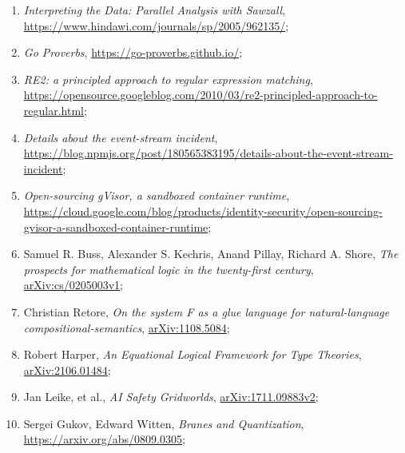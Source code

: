 \documentclass[a4paper,11pt]{article}
\begin{document}
\begin{enumerate}
\item \textit{Interpreting the Data: Parallel Analysis with Sawzall},
  \href{https://www.hindawi.com/journals/sp/2005/962135/}{https://www.hindawi.com/journals/sp/2005/962135/};

\item \textit{Go Proverbs},
  \href{https://go-proverbs.github.io/}{https://go-proverbs.github.io/};

\item \textit{RE2: a principled approach to regular expression
    matching}, \\
  \href{https://opensource.googleblog.com/2010/03/re2-principled-approach-to-regular.html}{https://opensource.googleblog.com/2010/03/re2-principled-approach-to-regular.html};

\item \textit{Details about the event-stream incident}, \\
  \href{https://blog.npmjs.org/post/180565383195/details-about-the-event-stream-incident}{https://blog.npmjs.org/post/180565383195/details-about-the-event-stream-incident};

\item \textit{Open-sourcing gVisor, a sandboxed container runtime}, \\
  \href{https://cloud.google.com/blog/products/identity-security/open-sourcing-gvisor-a-sandboxed-container-runtime}{https://cloud.google.com/blog/products/identity-security/open-sourcing-gvisor-a-sandboxed-container-runtime};

\item Samuel R. Buss, Alexander S. Kechris, Anand Pillay, Richard A.
  Shore, \textit{The prospects for mathematical logic in the
    twenty-first century},
  \href{https://arxiv.org/abs/cs/0205003v1}{arXiv:cs/0205003v1};

\item Christian Retore, \textit{On the system F as a glue language for
    natural-language compositional-semantics},
  \href{https://arxiv.org/abs/1108.5084}{arXiv:1108.5084};

\item Robert Harper, \textit{An Equational Logical Framework for Type
    Theories},
  \href{https://arxiv.org/abs/2106.01484}{arXiv:2106.01484};

\item Jan Leike, et al., \textit{AI Safety Gridworlds},
  \href{https://arxiv.org/abs/1711.09883}{arXiv:1711.09883v2};

\item Sergei Gukov, Edward Witten, \textit{Branes and Quantization},
  \href{https://arxiv.org/abs/0809.0305}{https://arxiv.org/abs/0809.0305};


\end{enumerate}
\end{document}
